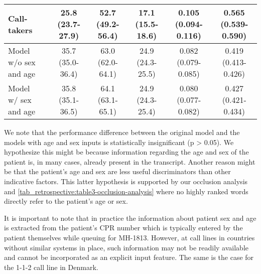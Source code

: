 {\begin{table}[h]
{\begin{tabular}{l|ccccc}
        Call-takers                             & \makecell[c]{25.8 \\ (23.7-27.9)} & \makecell[c]{52.7 \\ (49.2-56.4)} & \makecell[c]{17.1 \\ (15.5-18.6)} & \makecell[c]{0.105 \\ (0.094-0.116)} & \makecell[c]{0.565 \\ (0.539-0.590)} \\
        \midrule
        \makecell[l]{Model \\ w/o sex and age}  & \makecell[c]{35.7 \\ (35.0-36.4)} & \makecell[c]{63.0 \\ (62.0-64.1)} & \makecell[c]{24.9 \\ (24.3-25.5)} & \makecell[c]{0.082 \\ (0.079-0.085)} & \makecell[c]{0.419 \\ (0.413-0.426)} \\
        \midrule
        \makecell[l]{Model \\ w/ sex and age}   & \makecell[c]{35.8 \\ (35.1-36.5)} & \makecell[c]{64.1 \\ (63.1-65.1)} & \makecell[c]{24.9 \\ (24.3-25.4)} & \makecell[c]{0.080 \\ (0.077-0.082)} & \makecell[c]{0.427 \\ (0.421-0.434)} \\
 
        \bottomrule
    \end{tabular}%
    }
\end{table}

We note that the performance difference between the original model and the models with age and sex inputs is statistically insignificant (p > 0.05). We hypothesize this might be because information regarding the age and sex of the patient is, in many cases, already present in the transcript. Another reason might be that the patient's age and sex are less useful discriminators than other indicative factors. This latter hypothesis is supported by our occlusion analysis and \cref{tab_retrospective:table3-occlusion-analysis} where no highly ranked words directly refer to the patient's age or sex.

It is important to note that in practice the information about patient sex and age is extracted from the patient's CPR number which is typically entered by the patient themselves while queuing for MH-1813. However, at call lines in countries without similar systems in place, such information may not be readily available and cannot be incorporated as an explicit input feature. The same is the case for the 1-1-2 call line in Denmark.


}
